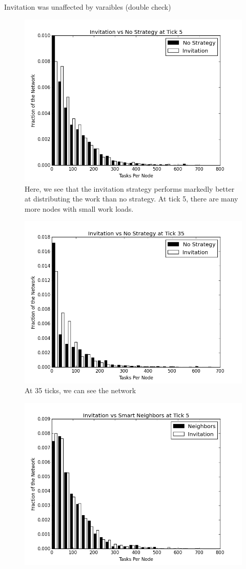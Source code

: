 Invitation was unaffected by varaibles (double check)

\begin{figure}
\centering
\includegraphics[width=0.7\linewidth]{figs/inviteStableHist5}
\caption[Invitiation vs no strategy after 5 ticks]{Here, we see that the invitation strategy performs markedly better at distributing the work than no strategy.  At tick 5, there are many more nodes with small work loads.}
\label{fig:inviteStableHist5}
\end{figure}

\begin{figure}
	\centering
	\includegraphics[width=0.7\linewidth]{figs/inviteStableHist35}
	\caption[Invitiation vs no strategy after 35 ticks]{At 35 ticks, we can see the network }
\label{fig:inviteStableHist35}
\end{figure}



\begin{figure}
	\centering
	\includegraphics[width=0.7\linewidth]{figs/inviteNeighborsHist5}
	\caption[Invitation  vs smart neighbor injection after 5 ticks.]{}
	\label{fig:inviteNeighborsHist5}
\end{figure}


